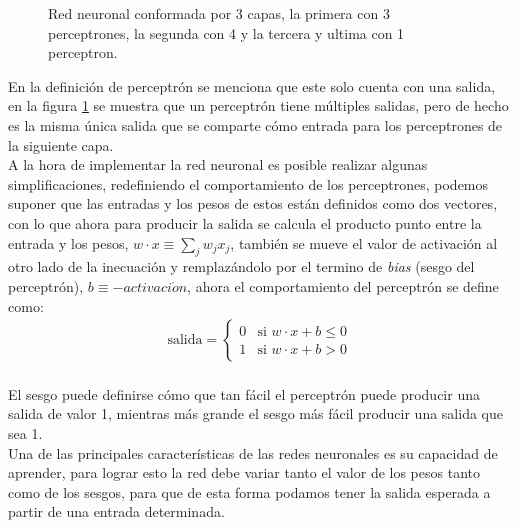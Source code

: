 \documentclass{iccmemoria}
\begin{document}
\begin{figure}[H]
  \centering
  \begin{large}
  
  \end{large}
  \caption{Red neuronal conformada por 3 capas, la primera con 3 perceptrones, la segunda con 4 y la tercera y ultima con 1 perceptron.}
  \label{fig:red neuronal}
\end{figure}

En la definición de perceptrón se menciona que este solo cuenta con una salida, en la figura \ref{fig:red neuronal} se muestra que un perceptrón tiene múltiples salidas, pero de hecho es la misma única salida que se comparte cómo entrada para los perceptrones de la siguiente capa.\\

A la hora de implementar la red neuronal es posible realizar algunas simplificaciones, redefiniendo el comportamiento de los perceptrones, podemos suponer que las entradas y los pesos de estos están definidos como dos vectores, con lo que ahora para producir la salida se calcula el producto punto entre la entrada y los pesos, $ w \cdot x \equiv \sum_{j}{} w_{j} x_{j} $, también se mueve el valor de activación al otro lado de la inecuación y remplazándolo por el termino de \emph{bias} (sesgo del perceptrón), $ b \equiv -activaci\acute{o}n$, ahora el comportamiento del perceptrón se define como:\\

\begin{equation}
	\begin{split}
		\mbox{salida} = \begin{cases}
			0 & \mbox{si } w\cdot x + b \leq 0 \\
      		1 & \mbox{si } w\cdot x + b > 0
		\end{cases}
	\end{split}
\end{equation}\\

El sesgo puede definirse cómo que tan fácil el perceptrón puede producir una salida de valor 1, mientras más grande el sesgo más fácil producir una salida que sea 1.\\

Una de las principales características de las redes neuronales es su capacidad de aprender, para lograr esto la red debe variar tanto el valor de los pesos tanto como de los sesgos, para que de esta forma podamos tener la salida esperada a partir de una entrada determinada.\\
\end{document}
